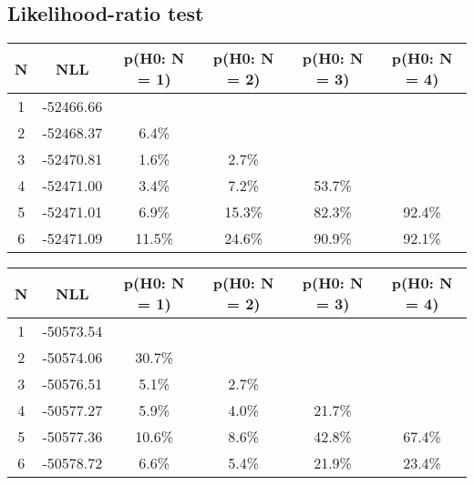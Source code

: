 \subsection{Likelihood-ratio test}
\begin{table}[htb]
	\begin{center}
{\footnotesize\renewcommand{\arraystretch}{1.4}
		\begin{tabular}{cc||cccc}
			N & NLL & p(H0: N = 1) & p(H0: N = 2) & p(H0: N = 3) & p(H0: N = 4)\\ 
		\hline
1 & -52466.66 & & & & \\
2 & -52468.37 & 6.4\% & & & \\
3 & -52470.81 & 1.6\% & 2.7\% & & \\
4 & -52471.00 & 3.4\% & 7.2\% & 53.7\% & \\
5 & -52471.01 & 6.9\% & 15.3\% & 82.3\% & 92.4\% \\
6 & -52471.09 & 11.5\% & 24.6\% & 90.9\% & 92.1\% \\
	\end{tabular}
		\label{tab:lab}
	}
	\end{center}\end{table}

\begin{table}[htb]
	\begin{center}
{\footnotesize\renewcommand{\arraystretch}{1.4}
		\begin{tabular}{cc||cccc}
			N & NLL & p(H0: N = 1) & p(H0: N = 2) & p(H0: N = 3) & p(H0: N = 4)\\ 
		\hline
1 & -50573.54 & & & & \\
2 & -50574.06 & 30.7\% & & & \\
3 & -50576.51 & 5.1\% & 2.7\% & & \\
4 & -50577.27 & 5.9\% & 4.0\% & 21.7\% & \\
5 & -50577.36 & 10.6\% & 8.6\% & 42.8\% & 67.4\% \\
6 & -50578.72 & 6.6\% & 5.4\% & 21.9\% & 23.4\% \\
	\end{tabular}
		\label{tab:lab}
	}
	\end{center}\end{table}

